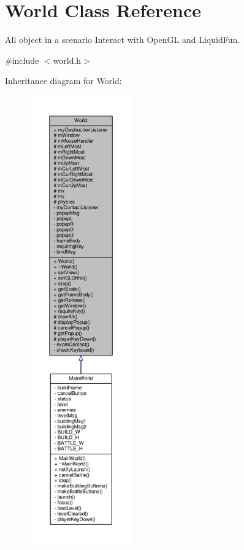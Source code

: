 \hypertarget{classWorld}{}\section{World Class Reference}
\label{classWorld}


All object in a scenario Interact with Open\+G\+L and Liquid\+Fun.  




{\ttfamily \#include $<$world.\+h$>$}



Inheritance diagram for World\+:
\nopagebreak
\begin{figure}[H]
\begin{center}
\leavevmode
\includegraphics[height=550pt]{classWorld__inherit__graph}
\end{center}
\end{figure}


